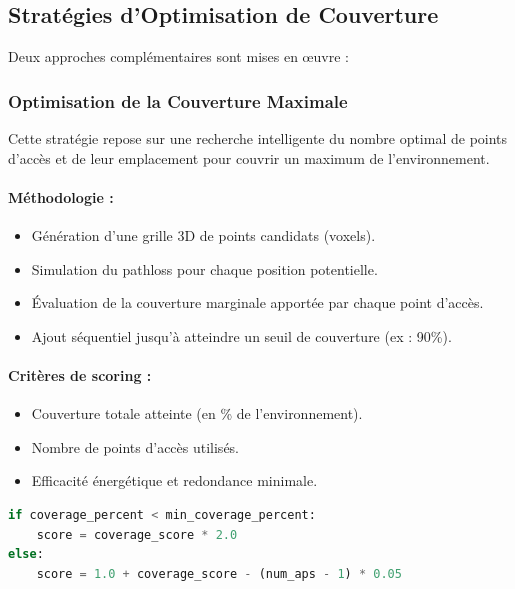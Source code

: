 \documentclass[12pt,a4paper]{article}
\begin{document}
\subsection{Stratégies d’Optimisation de Couverture}

Deux approches complémentaires sont mises en œuvre :

\subsubsection{Optimisation de la Couverture Maximale}

Cette stratégie repose sur une recherche intelligente du nombre optimal de points d’accès et de leur emplacement pour couvrir un maximum de l’environnement.

\paragraph{Méthodologie :}
\begin{itemize}
    \item Génération d’une grille 3D de points candidats (voxels).
    \item Simulation du pathloss pour chaque position potentielle.
    \item Évaluation de la couverture marginale apportée par chaque point d’accès.
    \item Ajout séquentiel jusqu’à atteindre un seuil de couverture (ex : 90\%).
\end{itemize}

\paragraph{Critères de scoring :}
\begin{itemize}
    \item Couverture totale atteinte (en \% de l’environnement).
    \item Nombre de points d’accès utilisés.
    \item Efficacité énergétique et redondance minimale.
\end{itemize}

\begin{lstlisting}[language=Python, caption={Extrait du scoring}, label={lst:scoring}]
if coverage_percent < min_coverage_percent:
    score = coverage_score * 2.0
else:
    score = 1.0 + coverage_score - (num_aps - 1) * 0.05
\end{lstlisting}
\end{document}
